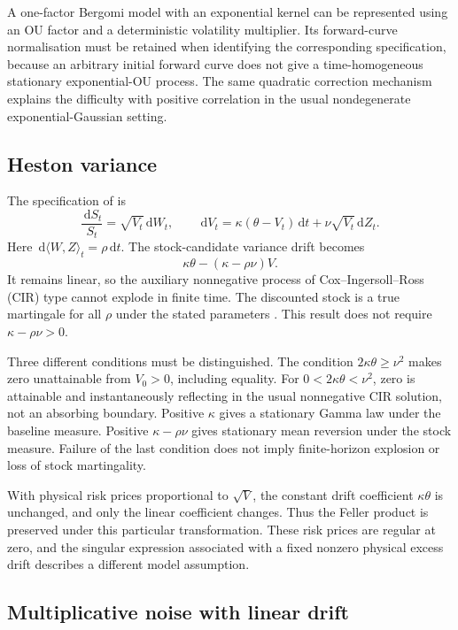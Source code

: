 \documentclass[11pt,a4paper]{article}
\theoremstyle{definition}
\theoremstyle{remark}
\newcommand{\dd}{\,\mathrm{d}}
\begin{document}
A one-factor Bergomi model with an exponential kernel \citep{Bergomi2005,Bergomi2016} can be represented using an OU factor and a deterministic volatility multiplier. Its forward-curve normalisation must be retained when identifying the corresponding specification, because an arbitrary initial forward curve does not give a time-homogeneous stationary exponential-OU process. The same quadratic correction mechanism explains the difficulty with positive correlation in the usual nondegenerate exponential-Gaussian setting.

\subsection{Heston variance}

The specification of \citet{Heston1993} is
\begin{equation}
 \frac{\dd S_t}{S_t}=\sqrt{V_t}\dd W_t,\qquad
 \dd V_t=\kappa(\theta-V_t)\dd t+\nu\sqrt{V_t}\dd Z_t.
 \label{eq:heston}
\end{equation}
Here \(\dd\langle W,Z\rangle_t=\rho\dd t\). The stock-candidate variance drift becomes
\[
 \kappa\theta-(\kappa-\rho\nu)V.
\]
It remains linear, so the auxiliary nonnegative process of Cox--Ingersoll--Ross (CIR) type cannot explode in finite time. The discounted stock is a true martingale for all \(\rho\) under the stated parameters \citep[Proposition~2.5]{AndersenPiterbarg2007}. This result does not require \(\kappa-\rho\nu>0\).

Three different conditions must be distinguished. The condition \(2\kappa\theta\geq\nu^2\) makes zero unattainable from \(V_0>0\), including equality. For \(0<2\kappa\theta<\nu^2\), zero is attainable and instantaneously reflecting in the usual nonnegative CIR solution, not an absorbing boundary. Positive \(\kappa\) gives a stationary Gamma law under the baseline measure. Positive \(\kappa-\rho\nu\) gives stationary mean reversion under the stock measure. Failure of the last condition does not imply finite-horizon explosion or loss of stock martingality.

With physical risk prices proportional to \(\sqrt V\), the constant drift coefficient \(\kappa\theta\) is unchanged, and only the linear coefficient changes. Thus the Feller product is preserved under this particular transformation. These risk prices are regular at zero, and the singular expression associated with a fixed nonzero physical excess drift describes a different model assumption.

\subsection{Multiplicative noise with linear drift}
\end{document}

